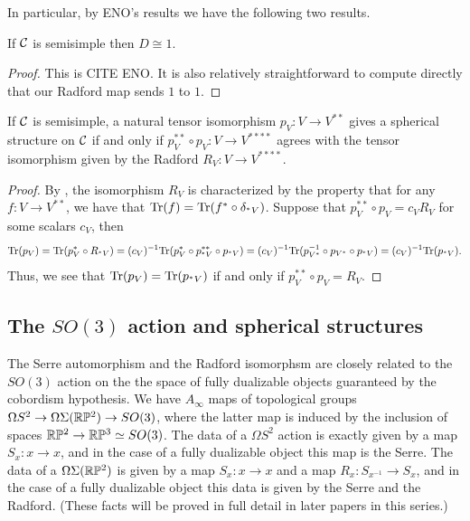 \documentclass{amsart}
\begin{document}
In particular, by ENO's results we have the following two results.

\begin{lemma}
If $\mathcal C$ is semisimple then $D \cong 1$.
\end{lemma}
\begin{proof}
This is CITE ENO.  It is also relatively straightforward to compute directly that our Radford map sends $1$ to $1$.
\end{proof}


\begin{lemma}
If $\mathcal C$ is semisimple, a natural tensor isomorphism $p_V: V \rightarrow V^{**}$ gives a spherical structure on $\mathcal C$ if and only if $p_V^{**} \circ p_V: V \rightarrow V^{****}$ agrees with the tensor isomorphism given by the Radford $R_V: V \rightarrow V^{****}$.
\end{lemma}
\begin{proof}
By \cite{???}, the isomorphism $R_V$ is characterized by the property that for any $f: V \rightarrow V^{**}$, we have that $\mathrm{Tr}(f) = \mathrm{Tr}(f^* \circ \delta_{{}^*V})$.  Suppose that $p_V^{**} \circ p_V = c_V R_V$ for some scalars $c_V$, then
$$\mathrm{Tr}(p_V) = \mathrm{Tr}(p_V^* \circ R_{{}^*V}) = (c_V)^{-1}\mathrm{Tr}(p_V^* \circ p_{{}^*V}^{**} \circ p_{{}^*V}) = (c_V)^{-1}\mathrm{Tr}(p_{V^*}^{-1} \circ p_{V^*} \circ p_{{}^*V}) = (c_V)^{-1}\mathrm{Tr}(p_{{}^*V}).$$
Thus, we see that $\mathrm{Tr}(p_V) = \mathrm{Tr}(p_{{}^*V})$ if and only if $p_V^{**} \circ p_V = R_V$.
\end{proof}

\subsection{The $SO(3)$ action and spherical structures}

The Serre automorphism and the Radford isomorphsm are closely related to the $SO(3)$ action on the the space of fully dualizable objects guaranteed by the cobordism hypothesis.  We have $A_\infty$ maps of topological groups $\Omega S^2 \rightarrow \Omega \Sigma (\mathbb R \mathbb P^2) \rightarrow SO(3)$, where the latter map is induced by the inclusion of spaces $\mathbb R \mathbb P^2 \to \mathbb R \mathbb P^3 \simeq SO(3)$.  The data of a $\Omega S^2$ action is exactly given by a map $S_x: x \rightarrow x$, and in the case of a fully dualizable object this map is the Serre.  The data of a $\Omega \Sigma (\mathbb R \mathbb P^2)$ is given by a map $S_x: x \rightarrow x$ and a map $R_x: S_{x^{-1}} \rightarrow S_x$, and in the case of a fully dualizable object this data is given by the Serre and the Radford.  (These facts will be proved in full detail in later papers in this series.)
\end{document}
